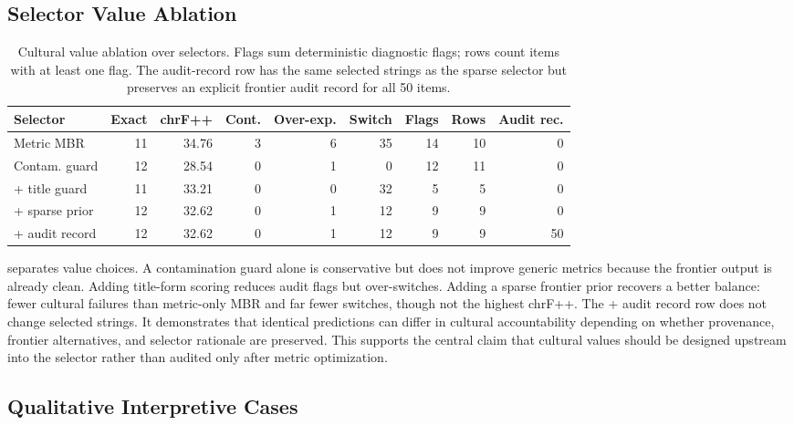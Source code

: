 \documentclass{article}
\renewcommand{\emph}[1]{{\paperitalic #1}}
\begin{document}
\subsection{Selector Value Ablation}

\begin{table}[t]
\centering
\tiny
\setlength{\tabcolsep}{2pt}
\begin{tabularx}{\columnwidth}{@{}Xrrrrrrrr@{}}
\toprule
Selector & Exact & chrF++ & Cont. & Over-exp. & Switch & Flags & Rows & Audit rec. \\
\midrule
Metric MBR & 11 & 34.76 & 3 & 6 & 35 & 14 & 10 & 0 \\
Contam. guard & 12 & 28.54 & 0 & 1 & 0 & 12 & 11 & 0 \\
+ title guard & 11 & 33.21 & 0 & 0 & 32 & 5 & 5 & 0 \\
+ sparse prior & 12 & 32.62 & 0 & 1 & 12 & 9 & 9 & 0 \\
+ audit record & 12 & 32.62 & 0 & 1 & 12 & 9 & 9 & 50 \\
\bottomrule
\end{tabularx}
\caption{Cultural value ablation over selectors. Flags sum deterministic diagnostic flags; rows count items with at least one flag. The audit-record row has the same selected strings as the sparse selector but preserves an explicit frontier audit record for all 50 items.}
\label{tab:ablation}
\end{table}

 separates value choices. A contamination guard alone is conservative but does not improve generic metrics because the frontier output is already clean. Adding title-form scoring reduces audit flags but over-switches. Adding a sparse frontier prior recovers a better balance: fewer cultural failures than metric-only MBR and far fewer switches, though not the highest chrF++. The \emph{+ audit record} row does not change selected strings. It demonstrates that identical predictions can differ in cultural accountability depending on whether provenance, frontier alternatives, and selector rationale are preserved. This supports the central claim that cultural values should be designed upstream into the selector rather than audited only after metric optimization.

\subsection{Qualitative Interpretive Cases}
\end{document}
